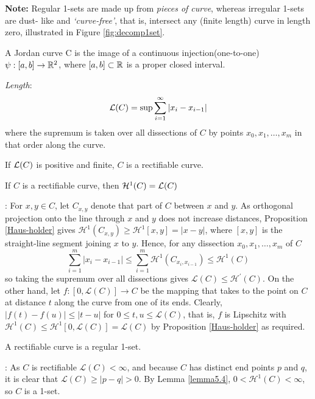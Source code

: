 \textbf{Note: }Regular 1-sets are made up from \textit{pieces of curve}, whereas irregular 1-sets are dust- like and \textit{‘curve-free’}, that is, intersect any (finite length) curve in length zero, illustrated in Figure \ref{fig:decomp1set}.

\begin{definition}
    A Jordan curve C is the image of a continuous injection(one-to-one) $\psi:[a,b]\rightarrow\mathbb{R}^2$, where $[a, b]\subset \mathbb{R}$ is a proper closed interval. 
\end{definition}

\textit{Length}: 
$$
\mathcal{L}(C) = \sup \sum_{i=1}^\infty |x_i - x_{i-1}|
$$
where the supremum is taken over all dissections of $C$ by points $x_0, x_1, \dots, x_m$ in that order along the curve. 

\begin{definition}
    If $\mathcal{L}(C)$ is positive and finite, $C$ is a rectifiable curve. 
\end{definition}

\begin{lemma}\label{lemma5.4}
    If $C$ is a rectifiable curve, then $\mathcal{H}^1(C) = \mathcal{L}(C)$
\end{lemma}
\proof:
For $x, y \in C$, let $C_{x, y}$ denote that part of $C$ between $x$ and $y$. As orthogonal projection onto the line through $x$ and $y$ does not increase distances, Proposition \ref{Haus-holder} gives $\mathcal{H}^{1}\left(C_{x, y}\right) \geq \mathcal{H}^{1}[x, y]=|x-y|$, where $[x, y]$ is the straight-line segment joining $x$ to $y$. Hence, for any dissection $x_{0}, x_{1}, \ldots, x_{m}$ of $C$
$$
\sum_{i=1}^{m}\left|x_{i}-x_{i-1}\right| \leq \sum_{i=1}^{m} \mathcal{H}^{1}\left(C_{x_{i}, x_{i-1}}\right) \leq \mathcal{H}^{1}(C)
$$
so taking the supremum over all dissections gives $\mathcal{L}(C) \leq \mathcal{H}^{\prime}(C)$. On the other hand, let $f:[0, \mathcal{L}(C)] \rightarrow C$ be the mapping that takes to the point on $C$ at distance $t$ along the curve from one of its ends. Clearly, $|f(t)-f(u)| \leq|t-u|$ for $0 \leq t, u \leq \mathcal{L}(C)$, that is, $f$ is Lipschitz with $\mathcal{H}^{1}(C) \leq \mathcal{H}^{1}[0, \mathcal{L}(C)]=\mathcal{L}(C)$ by Proposition \ref{Haus-holder} as required.

\begin{lemma}\label{lemma5.5}
    A rectifiable curve is a regular 1-set. 
\end{lemma}
\proof: As $C$ is rectifiable $\mathcal{L}(C)<\infty$, and because $C$ has distinct end points $p$ and $q$, it is clear that $\mathcal{L}(C) \geq|p-q|>0$. By Lemma \ref{lemma5.4}, $0<\mathcal{H}^{1}(C)<\infty$, so $C$ is a 1-set.

